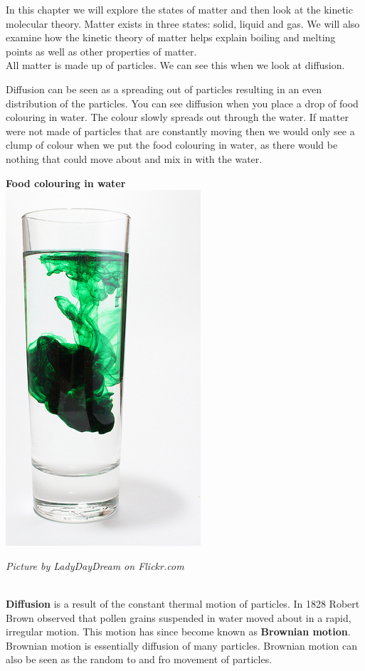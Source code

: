 \label{m38736*id802341}In this chapter we will explore the states of matter and then look at the kinetic molecular theory. Matter exists in three states: solid, liquid and gas. We will also examine how the kinetic theory of matter helps explain boiling and melting points as well as other properties of matter.\\
\label{m38736*id324876121}All matter is made up of particles. We can see this when we look at diffusion.
\begin{minipage}{.5\textwidth}
Diffusion can be seen as a spreading out of particles resulting in an even distribution of the particles. You can see diffusion when you place a drop of food colouring in water. The colour slowly spreads out through the water. If matter were not made of particles that are constantly moving then we would only see a clump of colour when we put the food colouring in water, as there would be nothing that could move about and mix in with the water.
\end{minipage}
\begin{minipage}{.5\textwidth}
\begin{center}
\textbf{Food colouring in water}\\
 \includegraphics[height=.5\textwidth]{photos/diffusionby-LadyDayDream-flickr.jpg}\par
\textit{Picture by LadyDayDream on Flickr.com}
\end{center}
\end{minipage}
\\ \newline
\label{m38736*id10987324}\textbf{Diffusion} is a result of the constant thermal motion of particles. In 1828 Robert Brown observed that pollen grains suspended in water moved about in a rapid, irregular motion. This motion has since become known as \textbf{Brownian motion}. Brownian motion is essentially diffusion of many particles. Brownian motion can also be seen as the random to and fro movement of particles. 
